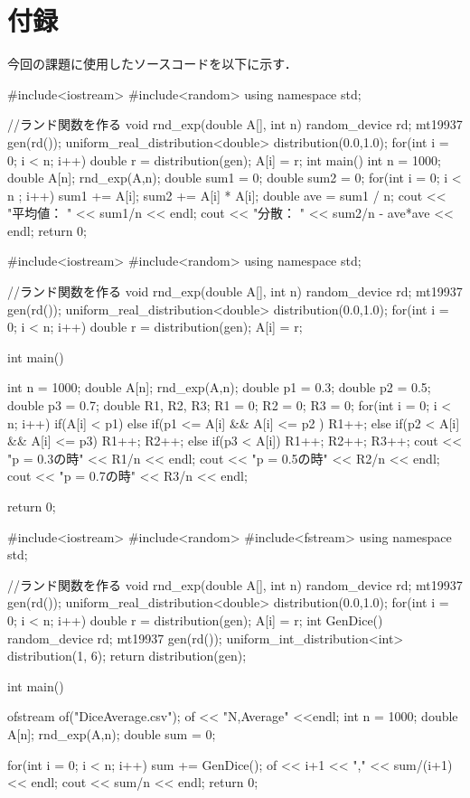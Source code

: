 \documentclass[fleqn, a4paper. 12pt]{ltjsarticle} %
\begin{document}
\section*{付録}
今回の課題に使用したソースコードを以下に示す．
\begin{cppcode}
  #include<iostream>
#include<random>
using namespace std;

//ランド関数を作る
void rnd_exp(double A[], int n){
    random_device rd;
    mt19937 gen(rd());
    uniform_real_distribution<double> distribution(0.0,1.0);
    for(int i = 0; i < n; i++){
        double r = distribution(gen);
        A[i] = r;
    }
}
int main(){
    int n = 1000;
    double A[n];
    rnd_exp(A,n);
    double sum1 = 0;
    double sum2 = 0;
    for(int i = 0; i < n ; i++){
        sum1 += A[i];
        sum2 += A[i] * A[i];
    }
    double ave = sum1 / n;
    cout << "平均値： " << sum1/n << endl;
    cout << "分散： " << sum2/n - ave*ave << endl;
    return 0;
}
\end{cppcode}
\begin{cppcode}
  #include<iostream>
#include<random>
using namespace std;

//ランド関数を作る
void rnd_exp(double A[], int n){
    random_device rd;
    mt19937 gen(rd());
    uniform_real_distribution<double> distribution(0.0,1.0);
    for(int i = 0; i < n; i++){
        double r = distribution(gen);
        A[i] = r;
    }
}

int main(){
    int n = 1000;
    double A[n];
    rnd_exp(A,n);
    double p1 = 0.3;
    double p2 = 0.5;
    double p3 = 0.7;
    double R1, R2, R3;
    R1 = 0;
    R2 = 0;
    R3 = 0;
    for(int i = 0; i < n; i++){
        if(A[i] < p1){
        }
        else if(p1 <= A[i] && A[i] <= p2 ){
            R1++;
        }
        else if(p2 < A[i] && A[i] <= p3){
            R1++;
            R2++;
        }
        else if(p3 < A[i]){
            R1++;
            R2++;
            R3++;
        }
    }
    cout << "p = 0.3の時" << R1/n << endl;
    cout << "p = 0.5の時" << R2/n << endl;
    cout << "p = 0.7の時" << R3/n << endl;

    return 0;
}
\end{cppcode}
\begin{cppcode}
  #include<iostream>
#include<random>
#include<fstream>
using namespace std;

//ランド関数を作る
void rnd_exp(double A[], int n){
    random_device rd;
    mt19937 gen(rd());
    uniform_real_distribution<double> distribution(0.0,1.0);
    for(int i = 0; i < n; i++){
        double r = distribution(gen);
        A[i] = r;
    }
}
int GenDice(){
    random_device rd;
    mt19937 gen(rd());
    uniform_int_distribution<int> distribution(1, 6);
    return distribution(gen);
}

int main(){
    ofstream of("DiceAverage.csv");
    of << "N,Average" <<endl; 
    int n = 1000;
    double A[n];
    rnd_exp(A,n);
    double sum = 0;

    for(int i = 0; i < n; i++){
        sum += GenDice();
        of << i+1 << "," << sum/(i+1) << endl;
    }
    cout << sum/n << endl;
    return 0;
}
\end{cppcode}
\end{document}
